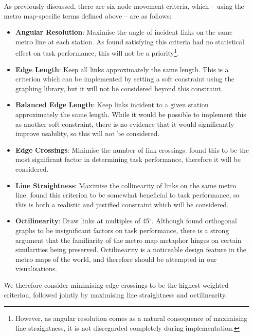 As previously discussed, there are six node movement criteria, which -- using the metro map-specific terms defined above -- are as follows:
\begin{itemize}
	\item\textbf{Angular Resolution}: Maximise the angle of incident links on the same metro line at each station. As \cite{WhichAesthetic} found satisfying this criteria had no statistical effect on task performance, this will not be a priority\footnote{However, as angular resolution comes as a natural consequence of maximising line straightness, it is not disregarded completely during implementation.}.
	
	\item\textbf{Edge Length}: Keep all links approximately the same length. This is a criterion which can be implemented by setting a soft constraint using the graphing library, but it will not be considered beyond this constraint.
	
	\item\textbf{Balanced Edge Length}: Keep links incident to a given station approximately the same length. While it would be possible to implement this as another soft constraint, there is no evidence that it would significantly improve usability, so this will not be considered.
	
	\item\textbf{Edge Crossings}: Minimise the number of link crossings. \citeauthor{WhichAesthetic} found this to be the most significant factor in determining task performance, therefore it will be considered.
	
	\item\textbf{Line Straightness}: Maximise the collinearity of links on the same metro line. \citeauthor{WhichAesthetic} found this criterion to be somewhat beneficial to task performance, so this is both a realistic and justified constraint which will be considered. 
	
	\item\textbf{Octilinearity}: Draw links at multiples of 45$^{\circ}$. Although \citeauthor{WhichAesthetic} found orthogonal graphs to be insignificant factors on task performance, there is a strong argument that the familiarity of the metro map metaphor hinges on certain similarities being preserved. Octilinearity is a noticeable design feature in the metro maps of the world, and therefore should be attempted in our visualisations.
\end{itemize}

We therefore consider minimising edge crossings to be the highest weighted criterion, followed jointly by maximising line straightness and octilinearity.

